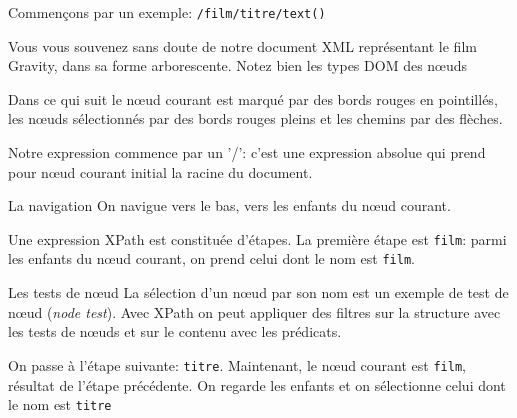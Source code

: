 \begin{frame}[allowframebreaks]{Commen\c{c}ons par un exemple: \texttt{/film/titre/text()}}

Vous vous souvenez sans doute de notre document XML représentant le film Gravity, dans
sa forme arborescente. Notez bien les types DOM des nœuds


\vfill


\begin{remark}
Dans ce qui suit le nœud courant est marqué par des \alert{bords rouges en pointillés},
les nœuds sélectionnés par des \alert{bords rouges pleins} et les chemins par
des flèches. 
\end{remark}

\framebreak

Notre expression commence par un '/': c'est une \alert{expression absolue} qui prend
pour nœud courant initial la \alert{racine du document}. 

\vfill


\vfill
\begin{block}{La navigation}
On navigue vers le bas, vers les enfants du nœud courant.
\end{block}

\framebreak

Une expression XPath est constituée \alert{d'étapes}. La première étape
est \texttt{film}: parmi les enfants du nœud courant, on prend
celui dont le \alert{nom} est \texttt{film}.
 
\vfill



\vfill

\vfill
\begin{block}{Les tests de nœud}
La sélection d'un nœud par son nom est un exemple de \alert{test de nœud} (\textit{node test}). 
Avec XPath on peut appliquer des filtres sur la \alert{structure} avec les \alert{tests de nœuds} et
sur le \alert{contenu} avec les \alert{prédicats}.
\end{block}

\framebreak

On passe à l'étape suivante: \texttt{titre}. Maintenant, le \alert{nœud courant} est
\texttt{film}, résultat de l'étape précédente. On regarde les enfants et on sélectionne
celui dont le nom est \texttt{titre}




\end{frame}
